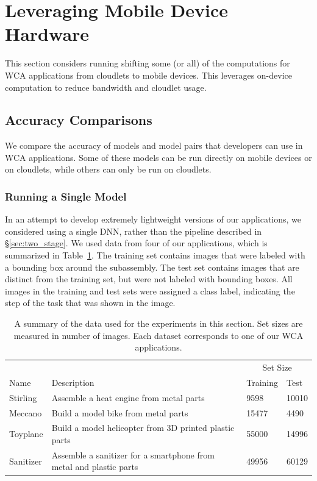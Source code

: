 \section{Leveraging Mobile Device Hardware}

This section considers running shifting some (or all) of the computations for
WCA applications from cloudlets to mobile devices.
This leverages on-device computation to reduce bandwidth and cloudlet usage.

\subsection{Accuracy Comparisons}

We compare the accuracy of models and model pairs that developers can use in WCA
applications.
Some of these models can be run directly on mobile devices or on cloudlets,
while others can only be run on cloudlets.

\subsubsection{Running a Single Model}\label{sec:single_model}

In an attempt to develop extremely lightweight versions of our applications,
we considered using a single DNN, rather than the pipeline described in
\S\ref{sec:two_stage}.
We used data from four of our applications, which is summarized in
Table~\ref{tab:dataset_size}.
The training set contains images that were labeled with a bounding box around
the subassembly.
The test set contains images that are distinct from the training set, but were
not labeled with bounding boxes.
All images in the training and test sets were assigned a class label, indicating
the step of the task that was shown in the image.

\begin{table}
\begin{tabular}{|l||p{10.5cm}|l|l|}
  \hline
  & & \multicolumn{2}{c|}{Set Size}\\
  Name & Description & Training & Test \\
  \hline
  \hline
  Stirling & Assemble a heat engine from metal parts & 9598 & 10010\\
  Meccano & Build a model bike from metal parts & 15477 & 4490\\
  Toyplane & Build a model helicopter from 3D printed plastic parts & 55000 & 14996\\
  Sanitizer & Assemble a sanitizer for a smartphone from metal and plastic parts & 49956 & 60129\\
  \hline
\end{tabular}
  \caption{
    A summary of the data used for the experiments in this section.
    Set sizes are measured in number of images.
    Each dataset corresponds to one of our WCA applications.
  }\label{tab:dataset_size}
\end{table}

